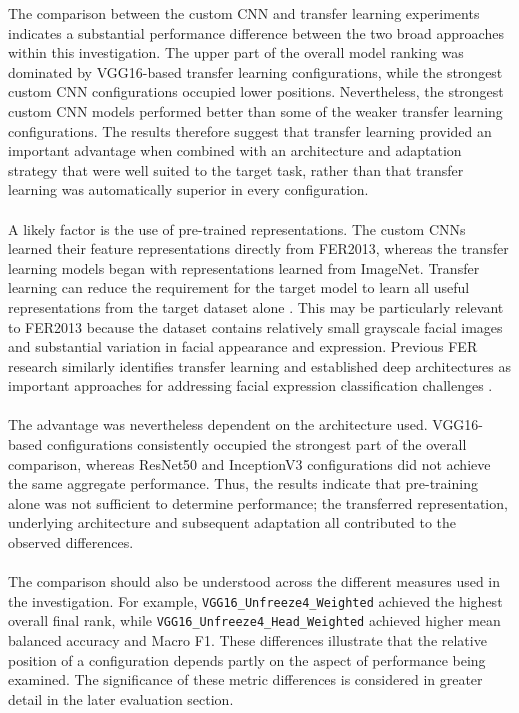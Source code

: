 \documentclass[12pt, a4paper]{report}
\begin{document}
				The comparison between the custom CNN and transfer learning experiments indicates a substantial performance difference between the two broad approaches within this investigation. The upper part of the overall model ranking was dominated by VGG16-based transfer learning configurations, while the strongest custom CNN configurations occupied lower positions. Nevertheless, the strongest custom CNN models performed better than some of the weaker transfer learning configurations. The results therefore suggest that transfer learning provided an important advantage when combined with an architecture and adaptation strategy that were well suited to the target task, rather than that transfer learning was automatically superior in every configuration.\\\\
				A likely factor is the use of pre-trained representations. The custom CNNs learned their feature representations directly from FER2013, whereas the transfer learning models began with representations learned from ImageNet. Transfer learning can reduce the requirement for the target model to learn all useful representations from the target dataset alone \cite{Pan2010TransferLearning}. This may be particularly relevant to FER2013 because the dataset contains relatively small grayscale facial images and substantial variation in facial appearance and expression. Previous FER research similarly identifies transfer learning and established deep architectures as important approaches for addressing facial expression classification challenges \cite{Georgiou2026FERReview, MejiaEscobar2023DataCentricFER}.\\\\
				The advantage was nevertheless dependent on the architecture used. VGG16-based configurations consistently occupied the strongest part of the overall comparison, whereas ResNet50 and InceptionV3 configurations did not achieve the same aggregate performance. Thus, the results indicate that pre-training alone was not sufficient to determine performance; the transferred representation, underlying architecture and subsequent adaptation all contributed to the observed differences.\\\\
				The comparison should also be understood across the different measures used in the investigation. For example, \texttt{VGG16\_Unfreeze4\_Weighted} achieved the highest overall final rank, while \texttt{VGG16\_Unfreeze4\_Head\_Weighted} achieved higher mean balanced accuracy and Macro F1. These differences illustrate that the relative position of a configuration depends partly on the aspect of performance being examined. The significance of these metric differences is considered in greater detail in the later evaluation section.
				
\end{document}
